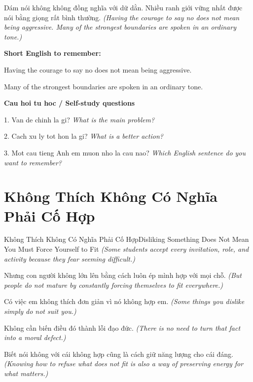 \begin{baihoc}
Dám nói không không đồng nghĩa với dữ dằn. Nhiều ranh giới vững nhất được nói bằng giọng rất bình thường.
\textit{(Having the courage to say no does not mean being aggressive. Many of the strongest boundaries are spoken in an ordinary tone.)}
\end{baihoc}

\begin{ghinhoanh}
\textbf{Short English to remember:}

Having the courage to say no does not mean being aggressive.

Many of the strongest boundaries are spoken in an ordinary tone.

\end{ghinhoanh}

\begin{tuhocnhanh}
\textbf{Cau hoi tu hoc / Self-study questions}

1. Van de chinh la gi? \textit{What is the main problem?}

2. Cach xu ly tot hon la gi? \textit{What is a better action?}

3. Mot cau tieng Anh em muon nho la cau nao? \textit{Which English sentence do you want to remember?}
\end{tuhocnhanh}
\ngancach

\section{Không Thích Không Có Nghĩa Phải Cố Hợp}
\begin{truyen}{Không Thích Không Có Nghĩa Phải Cố Hợp}{Disliking Something Does Not Mean You Must Force Yourself to Fit}
\textit{(Some students accept every invitation, role, and activity because they fear seeming difficult.)}

Nhưng con người không lớn lên bằng cách luôn ép mình hợp với mọi chỗ.
\textit{(But people do not mature by constantly forcing themselves to fit everywhere.)}

Có việc em không thích đơn giản vì nó không hợp em.
\textit{(Some things you dislike simply do not suit you.)}

Không cần biến điều đó thành lỗi đạo đức.
\textit{(There is no need to turn that fact into a moral defect.)}

Biết nói không với cái không hợp cũng là cách giữ năng lượng cho cái đáng.
\textit{(Knowing how to refuse what does not fit is also a way of preserving energy for what matters.)}

\end{truyen}

